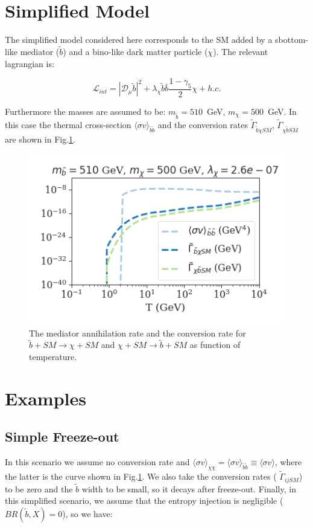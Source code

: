 \documentclass[preprint,notoc]{JHEP3}
\def\to{\rightarrow}
\def\tb{\tilde b}
\def\to{\rightarrow}
\def\tb{{\tilde{b}}}
\def\dm{{\chi}}
\begin{document}
\section{Simplified Model}

The simplified model considered here corresponds to the SM added by a sbottom-like mediator ($\tb$) and a bino-like dark matter particle ($\dm$). The relevant lagrangian is:

\begin{equation}
\mathcal{L}_{int} = |\mathcal{D}_\mu \tb|^2 + \lambda_{\dm} \tb \bar{b} \frac{1-\gamma_5}{2} \dm + h.c.
\end{equation}

Furthermore the masses are assumed to be: $m_\tb = 510$~GeV, $m_\dm = 500$~GeV.
In this case the thermal cross-section $\langle \sigma v  \rangle_{\tb \tb}$ and the conversion rates $\tilde{\Gamma}_{\tb \dm SM}$, $\tilde{\Gamma}_{\dm \tb SM}$are shown in Fig.\ref{fig:rates}.

\begin{figure}[h]
	\centering
	\includegraphics[scale=0.7]{rates.png}
	\caption{The mediator annihilation rate and the conversion rate for $\tb + SM \to \dm + SM$
	and $\dm + SM \to \tb + SM$ as function of temperature.} \label{fig:rates}
\end{figure}

\section{Examples}

\subsection{Simple Freeze-out}

In this scenario we assume no conversion rate and   $\langle \sigma v  \rangle_{\dm \dm} = \langle \sigma v  \rangle_{\tb \tb} \equiv \langle \sigma v \rangle$, where the latter is the curve shown in Fig.\ref{fig:rates}.
We also take the conversion rates ( $\tilde{\Gamma}_{ij SM}$) to be zero and the $\tb$ width
to be small, so it decays after freeze-out. Finally, in this simplified scenario, we assume that the 
entropy injection is negligible ($BR(\tb,X) = 0$), so we have:
\end{document}
